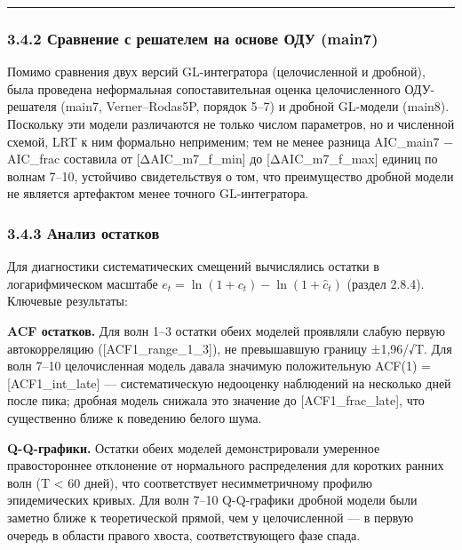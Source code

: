\documentclass[12pt]{article}
\begin{document}
\begin{center}\rule{0.5\linewidth}{0.5pt}\end{center}

\subsubsection{3.4.2 Сравнение с решателем на основе ОДУ
(main7)}\label{ux441ux440ux430ux432ux43dux435ux43dux438ux435-ux441-ux440ux435ux448ux430ux442ux435ux43bux435ux43c-ux43dux430-ux43eux441ux43dux43eux432ux435-ux43eux434ux443-main7}

Помимо сравнения двух версий GL-интегратора (целочисленной и дробной),
была проведена неформальная сопоставительная оценка целочисленного
ОДУ-решателя (main7, Verner--Rodas5P, порядок 5--7) и дробной GL-модели
(main8). Поскольку эти модели различаются не только числом параметров,
но и численной схемой, LRT к ним формально неприменим; тем не менее
разница AIC\_main7 − AIC\_frac составила от {[}ΔAIC\_m7\_f\_min{]} до
{[}ΔAIC\_m7\_f\_max{]} единиц по волнам 7--10, устойчиво свидетельствуя
о том, что преимущество дробной модели не является артефактом менее
точного GL-интегратора.

\subsubsection{3.4.3 Анализ
остатков}\label{ux430ux43dux430ux43bux438ux437-ux43eux441ux442ux430ux442ux43aux43eux432-1}

Для диагностики систематических смещений вычислялись остатки в
логарифмическом масштабе \(e_t = \ln(1 + c_t) - \ln(1 + \hat{c}_t)\)
(раздел 2.8.4). Ключевые результаты:

\textbf{ACF остатков.} Для волн 1--3 остатки обеих моделей проявляли
слабую первую автокорреляцию ({[}ACF1\_range\_1\_3{]}), не превышавшую
границу ±1,96/√T. Для волн 7--10 целочисленная модель давала значимую
положительную ACF(1) = {[}ACF1\_int\_late{]} --- систематическую
недооценку наблюдений на несколько дней после пика; дробная модель
снижала это значение до {[}ACF1\_frac\_late{]}, что существенно ближе к
поведению белого шума.

\textbf{Q-Q-графики.} Остатки обеих моделей демонстрировали умеренное
правостороннее отклонение от нормального распределения для коротких
ранних волн (T \textless{} 60 дней), что соответствует несимметричному
профилю эпидемических кривых. Для волн 7--10 Q-Q-графики дробной модели
были заметно ближе к теоретической прямой, чем у целочисленной --- в
первую очередь в области правого хвоста, соответствующего фазе спада.
\end{document}
